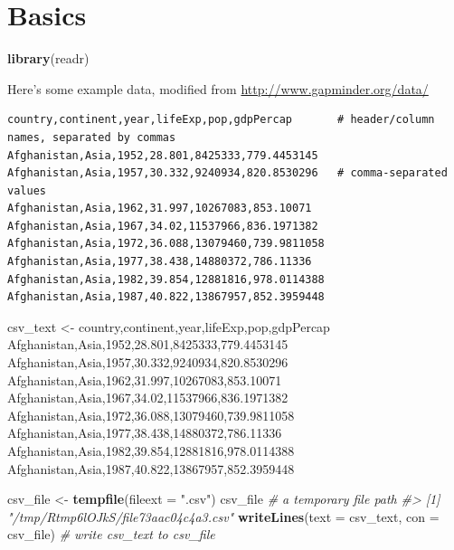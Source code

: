 \documentclass[
]{report}
\newenvironment{Shaded}{\begin{snugshade}}{\end{snugshade}}
\newcommand{\CommentTok}[1]{\textcolor[rgb]{0.56,0.35,0.01}{\textit{#1}}}
\newcommand{\DataTypeTok}[1]{\textcolor[rgb]{0.13,0.29,0.53}{#1}}
\newcommand{\KeywordTok}[1]{\textcolor[rgb]{0.13,0.29,0.53}{\textbf{#1}}}
\newcommand{\NormalTok}[1]{#1}
\newcommand{\StringTok}[1]{\textcolor[rgb]{0.31,0.60,0.02}{#1}}
\begin{document}
\hypertarget{basics}{%
\section{Basics}\label{basics}}

\begin{Shaded}
\begin{Highlighting}[]
\KeywordTok{library}\NormalTok{(readr)}
\end{Highlighting}
\end{Shaded}

Here's some example data, modified from \url{http://www.gapminder.org/data/}

\begin{verbatim}
country,continent,year,lifeExp,pop,gdpPercap       # header/column names, separated by commas
Afghanistan,Asia,1952,28.801,8425333,779.4453145
Afghanistan,Asia,1957,30.332,9240934,820.8530296   # comma-separated values
Afghanistan,Asia,1962,31.997,10267083,853.10071
Afghanistan,Asia,1967,34.02,11537966,836.1971382
Afghanistan,Asia,1972,36.088,13079460,739.9811058
Afghanistan,Asia,1977,38.438,14880372,786.11336
Afghanistan,Asia,1982,39.854,12881816,978.0114388
Afghanistan,Asia,1987,40.822,13867957,852.3959448
\end{verbatim}

\begin{Shaded}
\begin{Highlighting}[]
\NormalTok{csv\_text \textless{}{-}}\StringTok{ }
\StringTok{\textquotesingle{}country,continent,year,lifeExp,pop,gdpPercap     }
\StringTok{Afghanistan,Asia,1952,28.801,8425333,779.4453145}
\StringTok{Afghanistan,Asia,1957,30.332,9240934,820.8530296}
\StringTok{Afghanistan,Asia,1962,31.997,10267083,853.10071}
\StringTok{Afghanistan,Asia,1967,34.02,11537966,836.1971382}
\StringTok{Afghanistan,Asia,1972,36.088,13079460,739.9811058}
\StringTok{Afghanistan,Asia,1977,38.438,14880372,786.11336}
\StringTok{Afghanistan,Asia,1982,39.854,12881816,978.0114388}
\StringTok{Afghanistan,Asia,1987,40.822,13867957,852.3959448\textquotesingle{}}

\NormalTok{csv\_file \textless{}{-}}\StringTok{ }\KeywordTok{tempfile}\NormalTok{(}\DataTypeTok{fileext =} \StringTok{".csv"}\NormalTok{)      }
\NormalTok{csv\_file }\CommentTok{\# a temporary file path}
\CommentTok{\#\textgreater{} [1] "/tmp/Rtmp6lOJkS/file73aac04c4a3.csv"}
\KeywordTok{writeLines}\NormalTok{(}\DataTypeTok{text =}\NormalTok{ csv\_text, }\DataTypeTok{con =}\NormalTok{ csv\_file) }\CommentTok{\# write \textasciigrave{}csv\_text\textasciigrave{} to \textasciigrave{}csv\_file\textasciigrave{}}
\end{Highlighting}
\end{Shaded}
\end{document}

